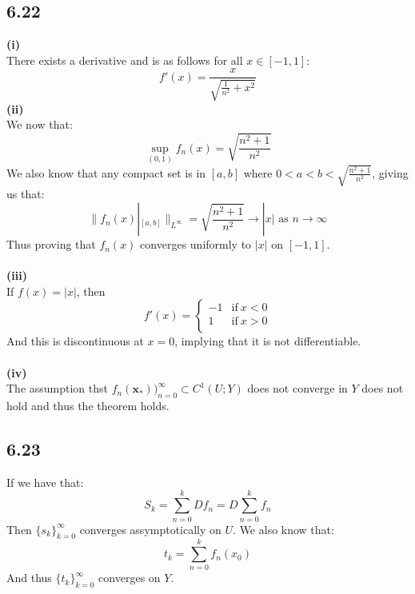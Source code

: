 \documentclass[letterpaper,12pt]{article}
\theoremstyle{definition}
\begin{document}
\subsection*{6.22}
\textbf{(i)}\\
There exists a derivative and is as follows for all $x \in [-1,1]$:
\[ f'(x) = \frac{x}{\sqrt{\frac{1}{n^2} + x^2} }\]
\textbf{(ii)}\\
We now that:
\[\sup_{(0,1)} f_n(x) = \sqrt{\frac{n^2 + 1}{n^2}}\] 
We also know that any compact set is in $[a,b]$ where $0<a<b<\sqrt{\frac{n^2+1}{n^2}}$, giving us that:
\[\|f_n(x)|_{[a,b]}\|_{L^\infty} = \sqrt{\frac{n^2+1}{n^2}} \to |x| \text{ as }n \to \infty\]
Thus proving that $f_n(x)$ converges uniformly to $|x|$ on $[-1,1]$.
\\ \\
\textbf{(iii)}\\
If $f(x) = |x|$, then 
\[f'(x) = \begin{cases} -1 & \text{if}~x < 0 \\ 1 & \text{if}~x>0\\\end{cases}\]
And this is discontinuous at $x=0$, implying that it is not differentiable. 
\\ \\
\textbf{(iv)}\\
The assumption thst $f_n(\mathbf{x}_*))_{n=0}^\infty \subset C^1(U;Y)$ does not 
        converge in $Y$ does not hold and thus the theorem holds.

\subsection*{6.23}
If we have that: 
\[S_k = \sum^{k}_{n=0}  Df_n = D \sum^{k}_{n=0} f_n \]
Then $\{s_k\}^\infty_{k=0}$ converges assymptotically on $U$. We also know that:
\[t_k = \sum^{k}_{n=0} f_n(x_0)\]
And thus $\{t_k\}_{k=0}^\infty$ converges on $Y$.
\end{document}
